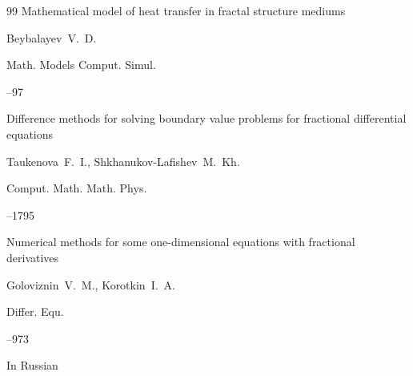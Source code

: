 \begin{thebibliography}{99}
\paper Mathematical model of heat transfer in fractal structure mediums

\by Beybalayev~V.~D.


\jour Math. Models Comput. Simul.




--97






\paper Difference methods for solving boundary value problems for fractional differential equations

\by Taukenova~F.~I., Shkhanukov-Lafishev~M.~Kh.


\jour Comput. Math. Math. Phys.




--1795






\paper Numerical methods for some one-dimensional equations with fractional derivatives

\by  Goloviznin~V.~M.,  Korotkin~I.~A.


\jour Differ. Equ.




--973





\lang In Russian


\end{thebibliography}
